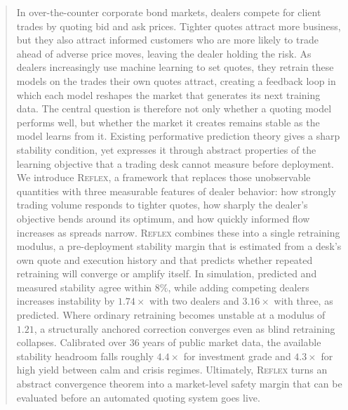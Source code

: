 \begin{abstract}
In over-the-counter corporate bond markets, dealers compete for client trades by
quoting bid and ask prices. Tighter quotes attract more business, but they also
attract informed customers who are more likely to trade ahead of adverse price
moves, leaving the dealer holding the risk. As dealers increasingly use machine
learning to set quotes, they retrain these models on the trades their own quotes
attract, creating a feedback loop in which each model reshapes the market that
generates its next training data. The central question is therefore not only
whether a quoting model performs well, but whether the market it creates remains
stable as the model learns from it. Existing performative prediction theory gives
a sharp stability condition, yet expresses it through abstract properties of the
learning objective that a trading desk cannot measure before deployment. We
introduce \textsc{Reflex}, a framework that replaces those unobservable
quantities with three measurable features of dealer behavior: how strongly
trading volume responds to tighter quotes, how sharply the dealer's objective
bends around its optimum, and how quickly informed flow increases as spreads
narrow. \textsc{Reflex} combines these into a single retraining modulus,
a pre-deployment stability margin that is estimated from a desk's own quote and
execution history and that predicts whether repeated retraining will converge or
amplify itself. In simulation, predicted and measured stability agree within
$8\%$, while adding competing dealers increases instability by $1.74\times$ with
two dealers and $3.16\times$ with three, as predicted. Where ordinary retraining
becomes unstable at a modulus of $1.21$, a structurally anchored correction
converges even as blind retraining collapses. Calibrated over $36$ years of
public market data, the available stability headroom falls roughly $4.4\times$
for investment grade and $4.3\times$ for high yield between calm and crisis
regimes. Ultimately, \textsc{Reflex}  turns an abstract convergence theorem into
a market-level safety margin that can be evaluated before an automated quoting
system goes live.
\end{abstract}
